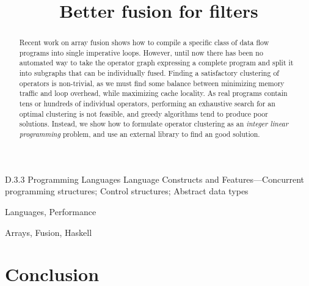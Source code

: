 \documentclass[preprint]{sigplanconf}
\begin{document}
\title{Better fusion for filters}


\maketitle
\makeatactive

\begin{abstract}
Recent work on array fusion shows how to compile a specific class of data flow programs into single imperative loops. However, until now there has been no automated way to take the operator graph expressing a complete program and split it into subgraphs that can be individually fused. Finding a satisfactory clustering of operators is non-trivial, as we must find some balance between minimizing memory traffic and loop overhead, while maximizing cache locality. As real programs contain tens or hundreds of individual operators, performing an exhaustive search for an optimal clustering is not feasible, and greedy algorithms tend to produce poor solutions. Instead, we show how to formulate operator clustering as an \emph{integer linear programming} problem, and use an external library to find an good solution. 



\end{abstract}


\category
	{D.3.3}
	{Programming Languages}
	{Language Constructs and Features---Concurrent programming structures; Control structures; Abstract data types}

\terms
	Languages, Performance

\keywords
	Arrays, Fusion, Haskell








\section{Conclusion}



\end{document}
